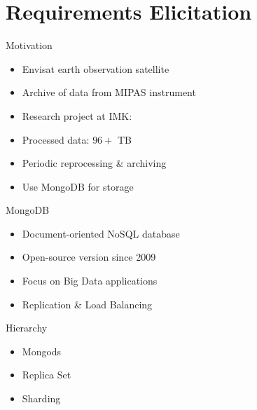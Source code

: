 \documentclass[11pt,aspectratio=169]{beamer}
\begin{document}
    \section{Requirements Elicitation}
    
    \begin{frame}{Motivation}
        \begin{itemize}
            \item Envisat earth observation satellite
            \item Archive of data from MIPAS instrument
            \item Research project at IMK: %
            \item {}Processed data: $96+$ TB
            \item Periodic reprocessing \& archiving 
            \item Use MongoDB for storage
        \end{itemize}
    \end{frame}
    
    \begin{frame}{MongoDB}

            \begin{itemize}
                            \item Document-oriented NoSQL database
                            \item Open-source version since 2009
                            \item Focus on Big Data applications
                            \item Replication \& Load Balancing
            \end{itemize}

        Hierarchy
        \begin{itemize}
            \item Mongods
            \item Replica Set
            \item Sharding
        \end{itemize}
    \end{frame}
\end{document}
